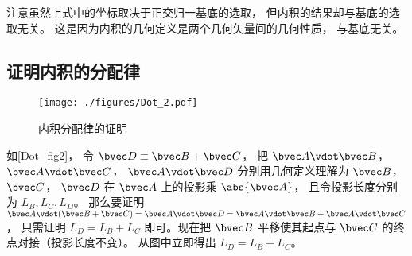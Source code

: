 注意虽然上式中的坐标取决于正交归一基底的选取， 但内积的结果却与基底的选取无关。 这是因为内积的几何定义是两个几何矢量间的几何性质， 与基底无关。

\subsection{证明内积的分配律}
\begin{figure}[ht]
\centering
\texttt{[image: ./figures/Dot\_2.pdf]}
\caption{内积分配律的证明} \label{Dot_fig2}
\end{figure}

如\autoref{Dot_fig2}， 令 $\bvec D \equiv \bvec B + \bvec C$， 把 $\bvec A \vdot \bvec B$，  $\bvec A \vdot \bvec C$，  $\bvec A \vdot \bvec D$ 分别用几何定义理解为 $\bvec B$，  $\bvec C$，  $\bvec D$ 在 $\bvec A$ 上的投影乘 $\abs{\bvec A}$， 且令投影长度分别为 $L_B, L_C, L_D$。 那么要证明 $\bvec A \vdot (\bvec B + \bvec C) = \bvec A \vdot \bvec D = \bvec A \vdot \bvec B + \bvec A \vdot \bvec C$， 只需证明 $L_D = L_B + L_C$ 即可。现在把 $\bvec B$ 平移使其起点与 $\bvec C$ 的终点对接（投影长度不变）。 从图中立即得出 $L_D = L_B + L_C$。  
